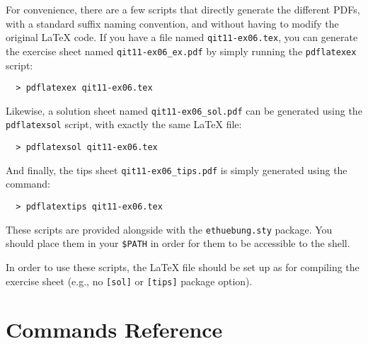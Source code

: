 \documentclass[11pt,a4paper]{article}
\begin{document}
For convenience, there are a few scripts that directly generate the different PDFs, with a
standard suffix naming convention, and without having to modify the original \LaTeX{}
code. If you have a file named \texttt{qit11-ex06.tex}, you can generate the exercise
sheet named \verb|qit11-ex06_ex.pdf| by simply running the \texttt{pdflatexex} script:
\begin{pkgverbatim}
\begin{verbatim}
  > pdflatexex qit11-ex06.tex
\end{verbatim}
\end{pkgverbatim}
Likewise, a solution sheet named \verb|qit11-ex06_sol.pdf| can be generated using the
\texttt{pdflatexsol} script, with exactly the same \LaTeX{} file:
\begin{pkgverbatim}
\begin{verbatim}
  > pdflatexsol qit11-ex06.tex
\end{verbatim}
\end{pkgverbatim}
And finally, the tips sheet \verb|qit11-ex06_tips.pdf| is simply generated using the
command:
\begin{pkgverbatim}
\begin{verbatim}
  > pdflatextips qit11-ex06.tex
\end{verbatim}
\end{pkgverbatim}

These scripts are provided alongside with the \texttt{ethuebung.sty} package. You should
place them in your \texttt{\$PATH} in order for them to be accessible to the shell.

\begin{pkgnotice}
  In order to use these scripts, the \LaTeX{} file should be set up as for compiling the
  exercise sheet (e.g., no \texttt{[sol]} or \texttt{[tips]} package option).
\end{pkgnotice}


\section{Commands Reference}
\label{sec:AllCommands}




\end{document}
